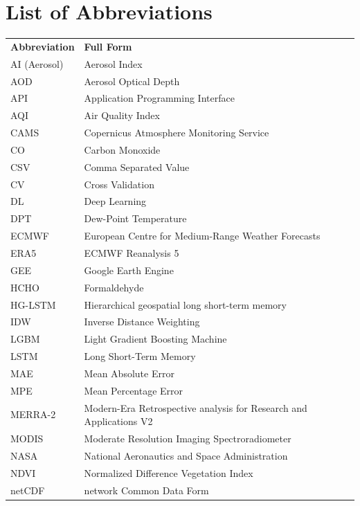 \documentclass[12pt]{report}
\begin{document}

\tableofcontents
\listoffigures
{}
\listoftables
{}
\chapter*{List of Abbreviations}

\begin{tabular}{l l}
\textbf{Abbreviation} & \textbf{Full Form} \\
AI (Aerosol) & Aerosol Index \\
AOD & Aerosol Optical Depth \\
API & Application Programming Interface \\
AQI & Air Quality Index \\
CAMS & Copernicus Atmosphere Monitoring Service \\
CO & Carbon Monoxide \\
CSV & Comma Separated Value \\
CV & Cross Validation \\
DL & Deep Learning \\
DPT & Dew-Point Temperature \\
ECMWF & European Centre for Medium-Range Weather Forecasts \\
ERA5 & ECMWF Reanalysis 5 \\
GEE & Google Earth Engine \\
HCHO & Formaldehyde \\
HG-LSTM & Hierarchical geospatial long short-term memory \\
IDW & Inverse Distance Weighting \\
LGBM & Light Gradient Boosting Machine \\
LSTM & Long Short-Term Memory \\
MAE & Mean Absolute Error \\
MPE & Mean Percentage Error \\
MERRA-2 & Modern-Era Retrospective analysis for Research and Applications V2 \\
MODIS & Moderate Resolution Imaging Spectroradiometer \\
NASA & National Aeronautics and Space Administration \\
NDVI & Normalized Difference Vegetation Index \\
netCDF & network Common Data Form \\
\end{tabular}
\end{document}

